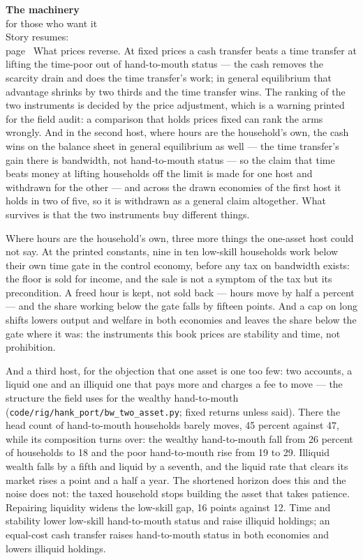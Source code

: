 \begin{machinery}{\textbf{The machinery}\\for those who want it\\[3pt]{\color{muted}Story resumes:\\page~\pageref{ch15}}}
\noindent What prices reverse. At fixed prices a cash transfer beats a time
transfer at lifting the time-poor out of hand-to-mouth status --- the
cash removes the scarcity drain and does the time transfer's work; in
general equilibrium that advantage shrinks by two thirds and the
time transfer wins. The ranking of the two instruments is decided by
the price adjustment, which is a warning printed for the field audit:
a comparison that holds prices fixed can rank the arms wrongly. And in
the second host, where hours are the household's own, the cash wins on
the balance sheet in general equilibrium as well --- the time transfer's
gain there is bandwidth, not hand-to-mouth status --- so
the claim that time beats money at lifting households off the limit is
made for one host and withdrawn for the other --- and across the drawn
economies of the first host it holds in two of five, so it is
withdrawn as a general claim altogether. What survives is that the two
instruments buy different things.

Where hours are the household's own, three more things the one-asset
host could not say. At the printed constants, nine in ten low-skill
households work below their own time gate in the control economy,
before any tax on bandwidth exists: the floor is sold for income, and the sale is not a symptom of
the tax but its precondition. A freed hour is kept, not sold back ---
hours move by half a percent --- and the share working below the gate
falls by fifteen points. And a cap on long shifts lowers output and
welfare in both economies and leaves the share below the gate where it
was: the instruments this book prices are stability and time, not
prohibition.

And a third host, for the objection that one asset is one too few:
two accounts, a liquid one and an illiquid one that pays more and
charges a fee to move --- the structure the field uses for the wealthy
hand-to-mouth (\texttt{code/\allowbreak{}rig/\allowbreak{}hank\_\allowbreak{}port/\allowbreak{}bw\_\allowbreak{}two\_\allowbreak{}asset.\allowbreak{}py}; fixed returns
unless said). There the head count of hand-to-mouth households barely
moves, 45 percent against 47, while its composition turns over: the
wealthy hand-to-mouth fall from 26 percent of households to 18 and the
poor hand-to-mouth rise from 19 to 29. Illiquid wealth falls by a
fifth and liquid by a seventh, and the liquid rate that clears its
market rises a point and a half a year. The shortened horizon does
this and the noise does not: the taxed household stops building the
asset that takes patience. Repairing liquidity widens the low-skill
gap, 16 points against 12. Time and stability lower low-skill
hand-to-mouth status and raise illiquid holdings; an equal-cost cash
transfer raises hand-to-mouth status in both economies and lowers
illiquid holdings.


\end{machinery}
